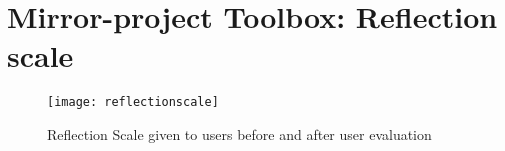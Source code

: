 \chapter{Mirror-project Toolbox: Reflection scale}
\begin{figure}[h!]
\label{reflectionscale}
\centering
	\texttt{[image: reflectionscale]}
\caption{Reflection Scale given to users before and after user evaluation}
\end{figure}
